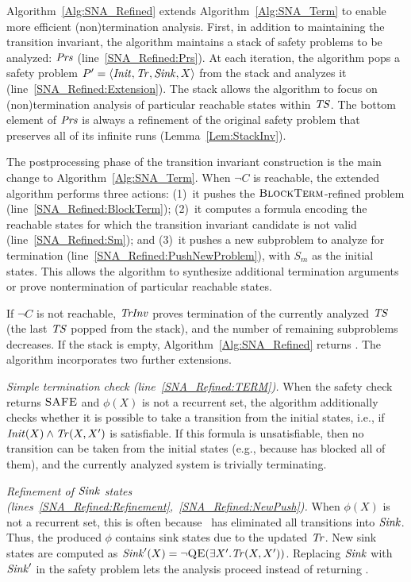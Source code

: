 Algorithm~\ref{Alg:SNA_Refined} extends Algorithm~\ref{Alg:SNA_Term} to enable more efficient (non)termination analysis.
First, in addition to maintaining the transition invariant,
the algorithm maintains a stack of safety problems to be analyzed: $\mathit{Prs}$ (line~\ref{SNA_Refined:Prs}).
At each iteration, the algorithm pops a safety problem $P' = \langle \mathit{Init}, \mathit{Tr}, \mathit{Sink}, X \rangle$ from the stack and analyzes it (line~\ref{SNA_Refined:Extension}).
The stack allows the algorithm to focus on (non)termination analysis of particular reachable states within 
$\mathit{TS}$.
The bottom element of $\mathit{Prs}$ is always a refinement of the original safety problem that preserves all of its
infinite runs (Lemma~\ref{Lem:StackInv}).

The postprocessing phase of the transition invariant construction is the main change to Algorithm~\ref{Alg:SNA_Term}.
When $\lnot C$ is reachable, the extended algorithm performs three actions: (1)~it pushes the $\textsc{BlockTerm}$-refined problem
(line~\ref{SNA_Refined:BlockTerm}); (2)~it computes a formula encoding the reachable states
for which the transition invariant candidate is not valid (line~\ref{SNA_Refined:Sm}); and (3)~it pushes a new
subproblem to analyze for termination (line~\ref{SNA_Refined:PushNewProblem}), with $S_m$ as the initial states.
This allows the algorithm to synthesize additional termination arguments or prove nontermination of particular 
reachable states.

If $\lnot C$ is not reachable, $\mathit{TrInv}$ proves termination of the currently analyzed $\mathit{TS}$ (the last $\mathit{TS}$ 
popped from the stack), and the number of remaining subproblems decreases.
If the stack is empty, Algorithm~\ref{Alg:SNA_Refined} returns \TERM.
The algorithm incorporates two further extensions.

\textit{Simple termination check (line~\ref{SNA_Refined:TERM}).} 
When the safety check returns $\textsc{SAFE}$ and $\phi(X)$ is not a recurrent set, 
the algorithm additionally checks whether it is possible to take a transition 
from the initial states, i.e., if $\mathit{Init}(X) \land \mathit{Tr}(X,X')$ is satisfiable.
If this formula is unsatisfiable, then no transition can be taken from the initial states
(e.g., because \blockTerm has blocked all of them),
and the currently analyzed system is trivially terminating.


\textit{Refinement of $\mathit{Sink}$ states (lines~\ref{SNA_Refined:Refinement},~\ref{SNA_Refined:NewPush}).} 
When $\phi(X)$ is not a recurrent set, this is often because \blockTerm\ 
has eliminated all transitions into $\mathit{Sink}$.
Thus, the produced $\phi$ contains sink states due to the updated $\mathit{Tr}$.
New sink states are computed as $\mathit{Sink}'(X) = \lnot \textsc{QE}(\exists X'. \mathit{Tr}(X,X'))$.
Replacing $\mathit{Sink}$ with $\mathit{Sink}'$ in the safety problem lets the analysis
proceed instead of returning \UNKNOWN.

